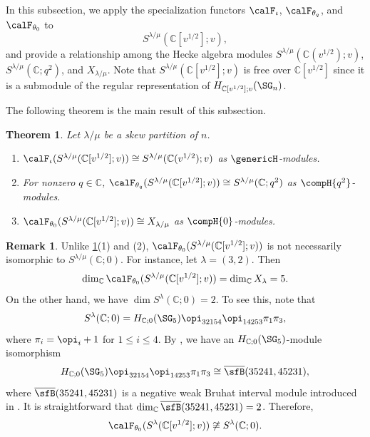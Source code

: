 \documentclass[12pt, reqno]{amsart}
\theoremstyle{plain}
\newtheorem{theorem}{Theorem}[section]
\theoremstyle{definition}
\newtheorem{remark}[remark]{Remark}
\numberwithin{equation}{section}
\numberwithin{figure}{section}
\numberwithin{table}{section}
\def\C{\mathbb C}
\begin{document}
In this subsection, we apply the specialization functors  $\calF_\iota$, $\calF_{\theta_q}$, and $\calF_{\theta_0}$ to 
$$S^{\lambda/\mu}(\C[v^{1/2}]; v),$$ and provide a relationship among the Hecke algebra modules $S^{\lambda/\mu}(\C(v^{1/2});v)$, $S^{\lambda/\mu}(\C; q^2)$, and $X_{\lambda/\mu}$.
Note that  $S^{\lambda/\mu}(\C[v^{1/2}]; v)$ is free over $\C[v^{1/2}]$ since it is a submodule of the regular representation  of $H_{\C[v^{1/2}];v}(\SG_n)$.

The following theorem is the main result of this subsection.
\begin{theorem}\label{thm: specialization of skew Specht module}
Let $\lambda/\mu$ be a skew partition of $n$.
\begin{enumerate}[label = {\rm (\arabic*)}]
\item $\calF_\iota(S^{\lambda/\mu}(\C[v^{1/2}];v)) \cong S^{\lambda/\mu}(\C(v^{1/2});v)$ as $\genericH$-modules.
\item 
For nonzero $q \in \C$, $\calF_{\theta_q}(S^{\lambda/\mu}(\C[v^{1/2}];v)) \cong S^{\lambda/\mu}(\C;q^2)$  
as $\compH{q^2}$-modules.
\item 
$\calF_{\theta_0}(S^{\lambda/\mu}(\C[v^{1/2}];v)) \cong X_{\lambda/\mu}$ as $\compH{0}$-modules.
\end{enumerate}  
\end{theorem}



\begin{remark}\label{rem: Specht and X}
Unlike \cref{thm: specialization of skew Specht module}(1) and (2), $\calF_{\theta_0}(S^{\lambda/\mu}(\C[v^{1/2}];v))$ is not necessarily isomorphic to $S^{\lambda/\mu}(\C;0)$.  
For instance, let $\lambda = (3,2)$.
Then 
\[
\dim_{\C} \calF_{\theta_0}(S^{\lambda/\mu}(\C[v^{1/2}];v)) =
\dim_{\C} X_{\lambda} = 5. 
\]
On the other hand, we have $\dim S^{\lambda}(\C;0) = 2$.
To see this, note that 
\[
S^\lambda(\C;0) = 
H_{\C;0}(\SG_5)
\opi_{32154}\opi_{14253}
\pi_{1} \pi_3,
\]
where $\pi_i = \opi_i + 1$ for $1 \le i \le 4$.
By \cite[Theorem 1(2)]{22JKLO}, we have an $H_{\C;0}(\SG_5)$-module isomorphism
\[
H_{\C;0}(\SG_5)
\opi_{32154}\opi_{14253}\pi_{1} \pi_3 \cong \overline{\sfB}(35241,45231),
\]
where $\overline{\sfB}(35241,45231)$ is a negative weak Bruhat interval module introduced in \cite[Definition 1]{22JKLO}.
It is straightforward that $\dim_{\C} \overline{\sfB}(35241,45231) = 2$.
Therefore, 
\[
\calF_{\theta_0}(S^{\lambda}(\C[v^{1/2}];v)) \not\cong S^\lambda(\C;0).
\]
\end{remark}
\end{document}
